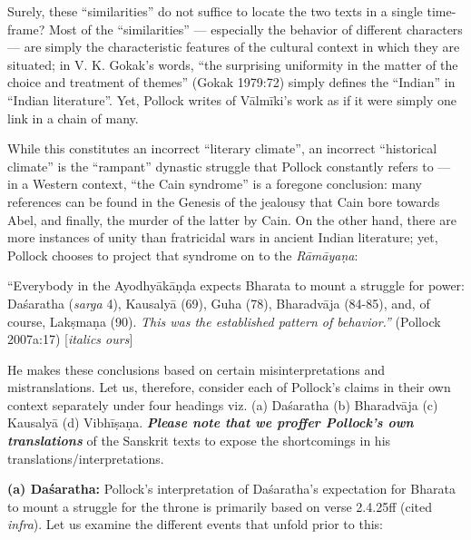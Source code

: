 Surely, these “similarities” do not suffice to locate the two texts in a single time-frame? Most of the “similarities” --- especially the behavior of different characters --- are simply the characteristic features of the cultural context in which they are situated; in V. K. Gokak’s words, “the surprising uniformity in the matter of the choice and treatment of themes” (Gokak 1979:72) simply defines the “Indian” in “Indian literature”. Yet, Pollock writes of Vālmīki’s work as if it were simply one link in a chain of many. 

While this constitutes an incorrect “literary climate”, an incorrect “historical climate” is the “rampant” dynastic struggle that Pollock constantly refers to --- in a Western context, “the Cain syndrome” is a foregone conclusion: many references can be found in the Genesis of the jealousy that Cain bore towards Abel, and finally, the murder of the latter by Cain. On the other hand, there are more instances of unity than fratricidal wars in ancient Indian literature; yet, Pollock chooses to project that syndrome on to the {\sl Rāmāyaṇa}: 

\begin{myquote}
“Everybody in the Ayodhyākāṇḍa expects Bharata to mount a struggle for power: Daśaratha ({\sl sarga} 4), Kausalyā (69), Guha (78), Bharadvāja (84-85), and, of course, Lakṣmaṇa (90). {\sl This was the established pattern of behavior.”}  
\hfill (Pollock 2007a:17) [{\sl italics ours}]
\end{myquote}

He makes these conclusions based on certain misinterpretations and mistranslations. Let us, therefore, consider each of Pollock’s claims in their own context separately under four headings viz. (a) Daśaratha (b) Bharadvāja (c) Kausalyā (d) Vibhīṣaṇa. {\sl\bfseries Please note that we proffer Pollock’s own translations} of the Sanskrit texts to expose the shortcomings in his translations/interpretations. 

\smallskip
\noindent
\textbf{(a) Daśaratha:} Pollock’s interpretation of Daśaratha’s expectation for Bharata to mount a struggle for the throne is primarily based on verse 2.4.25ff (cited {\sl infra}). Let us examine the different events that unfold prior to this: 

